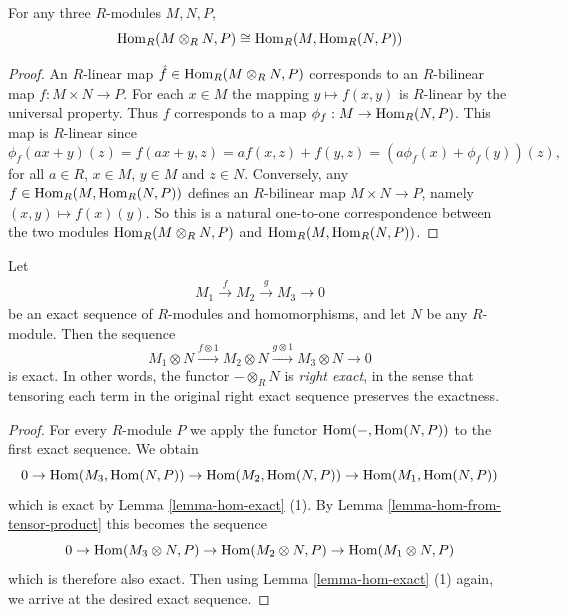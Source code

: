 \begin{lemma}
\label{lemma-hom-from-tensor-product}
For any three $R$-modules $M, N, P$,
$$
\mathop{\mathrm{Hom}}\nolimits_R(M \otimes_R N, P) \cong \mathop{\mathrm{Hom}}\nolimits_R(M,
\mathop{\mathrm{Hom}}\nolimits_R(N, P))
$$
\end{lemma}

\begin{proof}
An $R$-linear map $\hat{f}\in \mathop{\mathrm{Hom}}\nolimits_R(M
\otimes_R N, P)$ corresponds to an
$R$-bilinear map $f : M \times N \to P$. For
each $x\in M$ the mapping $y\mapsto f(x, y)$
is $R$-linear by the universal
property. Thus $f$ corresponds to a
map $\phi_f : M \to \mathop{\mathrm{Hom}}\nolimits_R(N, P)$. This map
is $R$-linear since
$$
\phi_f(ax + y)(z) =
f(ax + y, z) = af(x, z)+f(y, z) =
(a\phi_f(x)+\phi_f(y))(z),
$$
for all $a \in R$, $x \in M$, $y \in M$ and
$z \in N$. Conversely, any
$f \in \mathop{\mathrm{Hom}}\nolimits_R(M, \mathop{\mathrm{Hom}}\nolimits_R(N, P))$ defines an
$R$-bilinear
map $M \times N \to P$, namely $(x, y)\mapsto
f(x)(y)$.
So this is a natural one-to-one
correspondence between the
two modules
$\mathop{\mathrm{Hom}}\nolimits_R(M \otimes_R N, P)$ and $\mathop{\mathrm{Hom}}\nolimits_R(M,
\mathop{\mathrm{Hom}}\nolimits_R(N, P))$.
\end{proof}

\begin{lemma}
\label{lemma-tensor-product-exact}
Let
$$
\begin{aligned}
M_1\xrightarrow{f} M_2\xrightarrow{g} M_3 \to
0
\end{aligned}
$$
be an exact sequence of $R$-modules and
homomorphisms, and let $N$ be any
$R$-module. Then the sequence
\begin{equation}
\label{equation-2ndex}
M_1\otimes N\xrightarrow{f \otimes 1}
M_2\otimes N \xrightarrow{g \otimes 1}
M_3\otimes N \to 0
\end{equation}
is exact. In other words, the functor $-
\otimes_R N$ is
{\it right exact}, in the sense that
tensoring
each term in the original right exact
sequence preserves the exactness.
\end{lemma}

\begin{proof}
For every $R$-module $P$
we apply the functor $\mathop{\mathrm{Hom}}\nolimits(-, \mathop{\mathrm{Hom}}\nolimits(N, P))$ to
the first exact
sequence. We obtain
$$
0 \to
\mathop{\mathrm{Hom}}\nolimits(M_3, \mathop{\mathrm{Hom}}\nolimits(N, P)) \to
\mathop{\mathrm{Hom}}\nolimits(M_2, \mathop{\mathrm{Hom}}\nolimits(N, P)) \to
\mathop{\mathrm{Hom}}\nolimits(M_1, \mathop{\mathrm{Hom}}\nolimits(N, P))
$$
which is exact by Lemma \ref{lemma-hom-exact}
(1).
By Lemma \ref{lemma-hom-from-tensor-product}
this becomes the sequence
$$
0 \to \mathop{\mathrm{Hom}}\nolimits(M_3 \otimes N, P) \to
\mathop{\mathrm{Hom}}\nolimits(M_2 \otimes N, P) \to \mathop{\mathrm{Hom}}\nolimits(M_1 \otimes
N, P)
$$
which is therefore also exact. Then using
Lemma \ref{lemma-hom-exact} (1) again, we
arrive at the desired exact sequence.
\end{proof}


